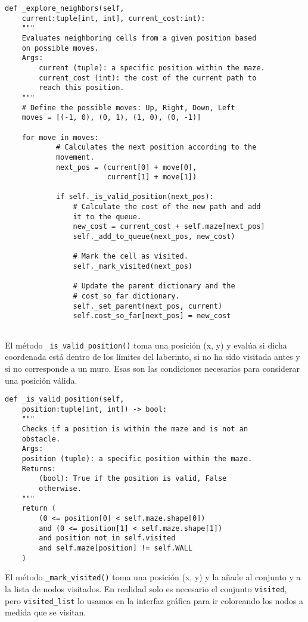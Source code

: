 \begin{lstlisting}
def _explore_neighbors(self,
    current:tuple[int, int], current_cost:int):
    """
    Evaluates neighboring cells from a given position based
    on possible moves.
    Args:
        current (tuple): a specific position within the maze.
        current_cost (int): the cost of the current path to
        reach this position.
    """
    # Define the possible moves: Up, Right, Down, Left
    moves = [(-1, 0), (0, 1), (1, 0), (0, -1)]

    for move in moves:
            # Calculates the next position according to the
            movement.
            next_pos = (current[0] + move[0],
                        current[1] + move[1])

            if self._is_valid_position(next_pos):
                # Calculate the cost of the new path and add
                it to the queue.
                new_cost = current_cost + self.maze[next_pos]
                self._add_to_queue(next_pos, new_cost)

                # Mark the cell as visited.
                self._mark_visited(next_pos)

                # Update the parent dictionary and the
                # cost_so_far dictionary.
                self._set_parent(next_pos, current)
                self.cost_so_far[next_pos] = new_cost


\end{lstlisting}
\clearpage
El método \lstinline{_is_valid_position()} toma una posición (x, y) y evalúa si dicha coordenada está dentro de los límites del laberinto, si no ha sido visitada antes y si no corresponde a un muro. Esas son las condiciones necesarias para considerar una posición válida.\\
\begin{lstlisting}
def _is_valid_position(self,
    position:tuple[int, int]) -> bool:
    """
    Checks if a position is within the maze and is not an
    obstacle.
    Args:
    position (tuple): a specific position within the maze.
    Returns:
        (bool): True if the position is valid, False
        otherwise.
    """
    return (
        (0 <= position[0] < self.maze.shape[0])
        and (0 <= position[1] < self.maze.shape[1])
        and position not in self.visited
        and self.maze[position] != self.WALL
    )

\end{lstlisting}
El método \lstinline{_mark_visited()} toma una posición (x, y) y la añade al conjunto y a la lista de nodos visitados. En realidad solo es necesario el conjunto \lstinline{visited}, pero \lstinline{visited_list} lo usamos en la interfaz gráfica para ir coloreando los nodos a medida que se visitan.\\
